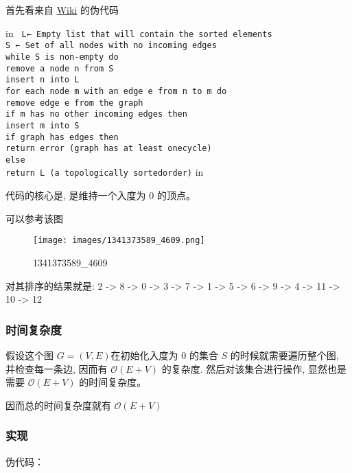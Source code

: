 首先看来自 \href{https://en.wikipedia.org/wiki/Topological_sorting#Kahn's_algorithm}{Wiki} 的伪代码

 in
\texttt{
L← Empty list that will contain the sorted elements\\S ← Set of all nodes with no incoming edges\\while S is non-empty do\\    remove a node n from S\\    insert n into L\\    for each node m with an edge e from n to m do\\        remove edge e from the graph\\        if m has no other incoming edges then\\            insert m into S\\if graph has edges then\\    return error (graph has at least onecycle)\\else \\    return L (a topologically sortedorder)}
 in

代码的核心是, 是维持一个入度为 0 的顶点。

可以参考该图

\begin{figure}[h]
\centering
\texttt{[image: images/1341373589\_4609.png]} 
\caption{1341373589_4609}
\end{figure}

对其排序的结果就是: 2 -> 8 -> 0 -> 3 -> 7 -> 1 -> 5 -> 6 -> 9 -> 4 -> 11 -> 10 -> 12

\subsubsection{时间复杂度}

假设这个图 $G = (V, E)$在初始化入度为 0 的集合 $S$ 的时候就需要遍历整个图, 并检查每一条边, 因而有 $\mathcal{O}(E+V)$ 的复杂度. 然后对该集合进行操作, 显然也是需要 $\mathcal{O}(E+V)$ 的时间复杂度。

因而总的时间复杂度就有 $\mathcal{O}(E+V)$

\subsubsection{实现}

伪代码：

